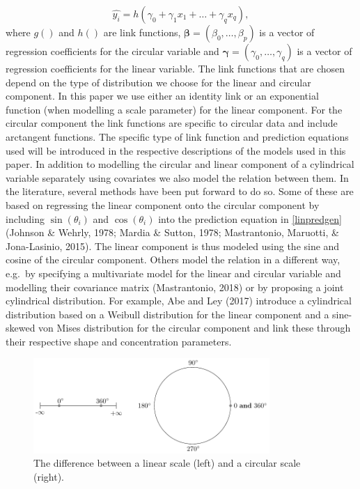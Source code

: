 \documentclass[man,mask]{apa6}
\begin{document}
\begin{equation}\label{linpredgen}
\hat{y_i} = h(\gamma_0 + \gamma_1x_1 + \dots + \gamma_qx_q),
\end{equation}
where \(g()\) and \(h()\) are link functions, \(\boldsymbol{\beta} = (\beta_0, \dots, \beta_p)\) is a vector of regression coefficients for the circular variable and
\(\boldsymbol{\gamma} = (\gamma_0, \dots, \gamma_q)\) is a vector of regression
coefficients for the linear variable. The link functions that are chosen depend
on the type of distribution we choose for the linear and circular component. In
this paper we use either an identity link or an exponential function (when
modelling a scale parameter) for the linear component. For the circular
component the link functions are specific to circular data and include
arctangent functions. The specific type of link function and prediction
equations used will be introduced in the respective descriptions of the models
used in this paper.\newline
\indent In addition to modelling the circular and linear component of a
cylindrical variable separately using covariates we also model the relation
between them. In the literature, several methods have been put forward to do so.
Some of these are based on regressing the linear component onto the circular
component by including \(\sin(\theta_i)\) and \(\cos(\theta_i)\) into the prediction
equation in \eqref{linpredgen} (Johnson \& Wehrly, 1978; Mardia \& Sutton, 1978; Mastrantonio, Maruotti, \& Jona-Lasinio, 2015). The linear component is thus modeled using the sine
and cosine of the circular component. Others model the relation in a different
way, e.g.~by specifying a multivariate model for the linear and circular
variable and modelling their covariance matrix (Mastrantonio, 2018) or by
proposing a joint cylindrical distribution. For example, Abe and Ley (2017)
introduce a cylindrical distribution based on a Weibull distribution for the
linear component and a sine-skewed von Mises distribution for the circular
component and link these through their respective shape and concentration
parameters.

\begin{figure}
\centering
\includegraphics[width = 0.8\textwidth]{Plots/circline.pdf}
\caption{The difference between a linear scale (left) and a circular scale (right).}
\label{circline}
\end{figure}
\end{document}
